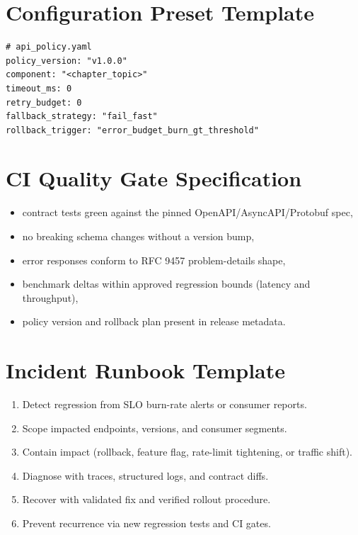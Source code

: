 \section{Configuration Preset Template}
\begin{verbatim}
# api_policy.yaml
policy_version: "v1.0.0"
component: "<chapter_topic>"
timeout_ms: 0
retry_budget: 0
fallback_strategy: "fail_fast"
rollback_trigger: "error_budget_burn_gt_threshold"
\end{verbatim}

\section{CI Quality Gate Specification}
\begin{itemize}
  \item contract tests green against the pinned OpenAPI/AsyncAPI/Protobuf spec,
  \item no breaking schema changes without a version bump,
  \item error responses conform to RFC 9457 problem-details shape,
  \item benchmark deltas within approved regression bounds (latency and throughput),
  \item policy version and rollback plan present in release metadata.
\end{itemize}

\section{Incident Runbook Template}
\begin{enumerate}
  \item Detect regression from SLO burn-rate alerts or consumer reports.
  \item Scope impacted endpoints, versions, and consumer segments.
  \item Contain impact (rollback, feature flag, rate-limit tightening, or traffic shift).
  \item Diagnose with traces, structured logs, and contract diffs.
  \item Recover with validated fix and verified rollout procedure.
  \item Prevent recurrence via new regression tests and CI gates.
\end{enumerate}

